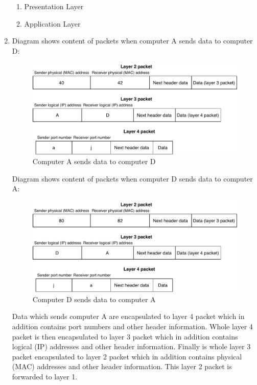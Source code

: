 \documentclass[a4paper, 11pt]{article}
\begin{document}
\begin{enumerate}
\begin{enumerate}[1]
				\item %
					Presentation Layer

				\item %
					Application Layer
			\end{enumerate}

		\item %
			Diagram shows content of packets when computer A sends data to computer D:
			\begin{figure}[ht]
				\centering
				\includegraphics[width=0.7\linewidth]{inc/layer_packets_a_to_d.pdf}
				\caption{Computer A sends data to computer D}
				\label{figure:layer_packets_a_to_d}
			\end{figure}

			Diagram shows content of packets when computer D sends data to computer A:
			\begin{figure}[ht]
				\centering
				\includegraphics[width=0.7\linewidth]{inc/layer_packets_d_to_a.pdf}
				\caption{Computer D sends data to computer A}
				\label{figure:layer_packets_d_to_a}
			\end{figure}

			Data which sends computer A are encapsulated to layer 4 packet which in addition contains port
			numbers and other header information. Whole layer 4 packet is then encapsulated to layer 3 packet
			which in addition contains logical (IP) addresses and other header information. Finally is whole
			layer 3 packet encapsulated to layer 2 packet which in addition contains physical (MAC) addresses
			and other header information. This layer 2 packet is forwarded to layer 1.


\end{enumerate}
\end{document}
